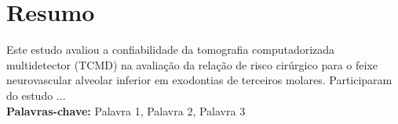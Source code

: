 \section{Resumo} 
\noindent %
Este estudo avaliou a confiabilidade da tomografia
computadorizada multidetector (TCMD) na avaliação da relação de risco
cirúrgico para o feixe neurovascular alveolar inferior em exodontias de
terceiros molares. Participaram do estudo ... \\ %

\noindent \textbf{Palavras-chave:}
Palavra 1, Palavra 2, Palavra 3